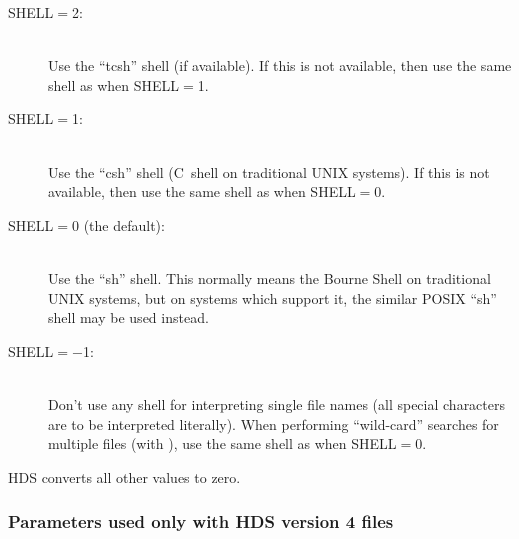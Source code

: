 \documentclass[twoside,11pt]{starlink}
\providecommand{\qt}[1]{``#1''}
\begin{document}
\begin{description}
\begin{description}

\item[SHELL$=$2:]\mbox{}\\
Use the \qt{tcsh} shell (if available). If this is not available, then
use the same shell as when SHELL$=$1.

\item[SHELL$=$1:]\mbox{}\\
Use the \qt{csh} shell (C~shell on traditional UNIX systems). If this
is not available, then use the same shell as when SHELL$=$0.

\item[SHELL$=$0 (the default):]\mbox{}\\
Use the \qt{sh} shell. This normally means the Bourne Shell on
traditional UNIX systems, but on systems which support it, the similar
POSIX \qt{sh} shell may be used instead.

\item[SHELL$=-$1:]\mbox{}\\
Don't use any shell for interpreting single file names (all special
characters are to be interpreted literally). When performing
\qt{wild-card} searches for multiple files (with
), use the same shell as when SHELL$=$0.

\end{description}

HDS converts all other values to zero.

\end{description}

\subsubsection*{Parameters used only with HDS version 4 files}
\end{document}
